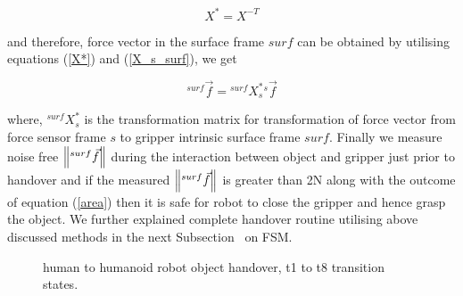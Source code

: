 \documentclass[a4paper, 12pt, oneside]{Thesis}  %
\begin{document}
\begin{equation}\label{X*}
    X^{*} = X^{-T}
\end{equation}

and therefore, force vector in the surface frame $surf$ can be obtained by utilising equations (\ref{X*}) and (\ref{X_s_surf}), we get

\begin{equation}\label{force surf}
    {}^{surf}\vec{f} = {}^{surf}X_{s}^{*} {}^s\vec{f}
\end{equation}

where, ${}^{surf}X_{s}^{*}$ is the transformation matrix for transformation of force vector from force sensor frame $s$ to gripper intrinsic surface frame $surf$. Finally we measure noise free $\norm{{}^{surf}\vec{f}}$ during the interaction between object and gripper just prior to handover and if the measured $\norm{{}^{surf}\vec{f}}$ is greater than 2N along with the outcome of equation (\ref{area}) then it is safe for robot to close the gripper and hence grasp the object. We further explained complete handover routine utilising above discussed methods in the next Subsection~ on FSM.

\begin{figure}[hpt]
	\caption{human to humanoid robot object handover, t1 to t8 transition states.}
	\label{fig:h-to-r}
\end{figure}
\end{document}
